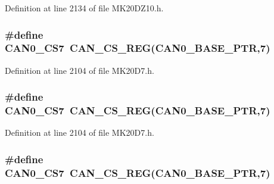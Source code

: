 Definition at line 2134 of file M\+K20\+D\+Z10.\+h.

\subsubsection[{\texorpdfstring{C\+A\+N0\+\_\+\+C\+S7}{CAN0_CS7}}]{\setlength{\rightskip}{0pt plus 5cm}\#define C\+A\+N0\+\_\+\+C\+S7~{\bf C\+A\+N\+\_\+\+C\+S\+\_\+\+R\+EG}({\bf C\+A\+N0\+\_\+\+B\+A\+S\+E\+\_\+\+P\+TR},7)}\hypertarget{group___c_a_n___register___accessor___macros_gaf861ea3a6f00fb652a465b178096112b}{}\label{group___c_a_n___register___accessor___macros_gaf861ea3a6f00fb652a465b178096112b}


Definition at line 2104 of file M\+K20\+D7.\+h.

\subsubsection[{\texorpdfstring{C\+A\+N0\+\_\+\+C\+S7}{CAN0_CS7}}]{\setlength{\rightskip}{0pt plus 5cm}\#define C\+A\+N0\+\_\+\+C\+S7~{\bf C\+A\+N\+\_\+\+C\+S\+\_\+\+R\+EG}({\bf C\+A\+N0\+\_\+\+B\+A\+S\+E\+\_\+\+P\+TR},7)}\hypertarget{group___c_a_n___register___accessor___macros_gaf861ea3a6f00fb652a465b178096112b}{}\label{group___c_a_n___register___accessor___macros_gaf861ea3a6f00fb652a465b178096112b}


Definition at line 2104 of file M\+K20\+D7.\+h.

\subsubsection[{\texorpdfstring{C\+A\+N0\+\_\+\+C\+S7}{CAN0_CS7}}]{\setlength{\rightskip}{0pt plus 5cm}\#define C\+A\+N0\+\_\+\+C\+S7~{\bf C\+A\+N\+\_\+\+C\+S\+\_\+\+R\+EG}({\bf C\+A\+N0\+\_\+\+B\+A\+S\+E\+\_\+\+P\+TR},7)}\hypertarget{group___c_a_n___register___accessor___macros_gaf861ea3a6f00fb652a465b178096112b}{}\label{group___c_a_n___register___accessor___macros_gaf861ea3a6f00fb652a465b178096112b}


